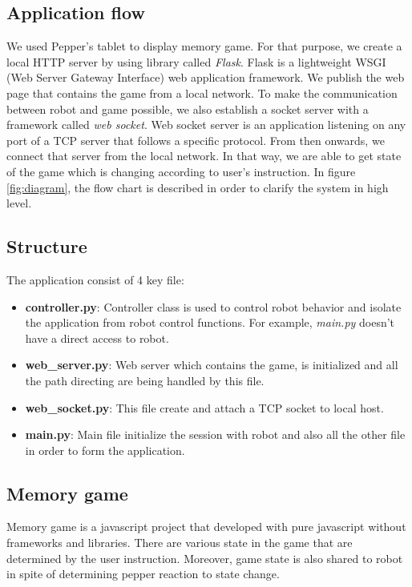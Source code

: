 \documentclass[12pt]{article}
\begin{document}
\subsection{Application flow}
We used Pepper's tablet to display memory game. For that purpose, we create a local HTTP server by using library called \textit{Flask}. Flask is a lightweight WSGI (Web Server Gateway Interface) web application framework. We publish the web page that contains the game from a local network. To make the communication between robot and game possible, we also establish a socket server with a framework called \textit{web socket}. Web socket server is an application listening on any port of a TCP server that follows a specific protocol. From then onwards,  we connect that server from the local network. In that way, we are able to get state of the game which is changing according to user's instruction. In figure \ref{fig:diagram}, the flow chart is described in order to clarify the system in high level.
\subsection{Structure}
The application consist of 4 key file:
\begin{itemize}
\item \textbf{controller.py}: Controller class is used to control robot behavior and isolate the application from robot control functions. For example, \textit{main.py} doesn't have a direct access to robot.
\item \textbf{web\_server.py}: Web server which contains the game, is initialized and all the path directing are being handled by this file.
\item \textbf{web\_socket.py}: This file create and attach a TCP socket to local host.
\item \textbf{main.py}: Main file initialize the session with robot and also all the other file in order to form the application.
\end{itemize}
\subsection{Memory game}
Memory game is a javascript project that developed with pure javascript without frameworks and libraries. There are various state in the game that are determined by the user instruction. Moreover, game state is also shared to robot in spite of determining pepper reaction to state change.
\end{document}
